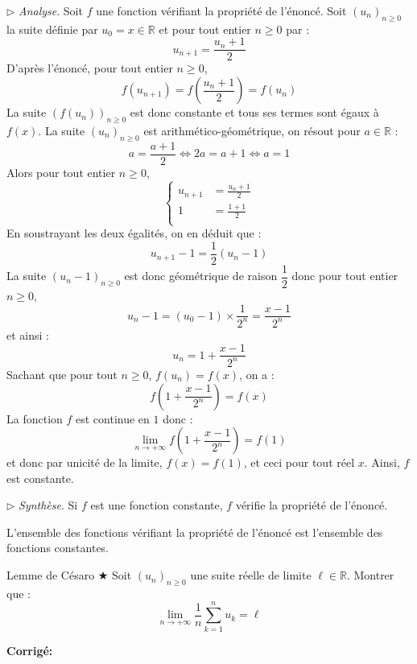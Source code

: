 \documentclass[a4paper,twoside,french,10pt]{VcCours}
\newcommand{\corr}{\textbf{Corrigé:}}
\begin{document}
\medskip

\noindent $\rhd$ \textit{Analyse}. Soit $f$ une fonction vérifiant la propriété de l'énoncé. Soit $(u_n)_{n \geq 0}$ la suite définie par $u_0=x \in \mathbb{R}$ et pour tout entier $n \geq 0$ par :
$$ u_{n+1} = \dfrac{u_n+1}{2}$$
D'après l'énoncé, pour tout entier $n \geq 0$,
$$ f(u_{n+1}) = f \left( \frac{u_n+1}{2} \right) = f(u_n)$$
La suite $(f(u_n))_{n \geq 0}$ est donc constante et tous ses termes sont égaux à $f(x)$. La suite $(u_n)_{n \geq 0}$ est arithmético-géométrique, on résout pour $a \in \mathbb{R}$ : 
$$ a = \dfrac{a+1}{2} \Longleftrightarrow 2a=a+1 \Longleftrightarrow a=1$$
Alors pour tout entier $n \geq 0$,
$$ \left\lbrace \begin{array}{cl}
u_{n+1} & =  \frac{u_n+1}{2}  \\[0.1cm]
1 & =  \frac{1+1}{2}  \\
\end{array}\right.$$
En soustrayant les deux égalités, on en déduit que :
$$u_{n+1}-1 = \dfrac{1}{2} (u_n-1)$$
La suite $(u_n-1)_{n \geq 0}$ est donc géométrique de raison $\dfrac{1}{2}$ donc pour tout entier $n \geq 0$,
$$ u_n - 1 = (u_0-1) \times \dfrac{1}{2^n} = \dfrac{x-1}{2^n}$$
et ainsi :
$$ u_n = 1 +  \dfrac{x-1}{2^n}$$
Sachant que pour tout $n \geq 0$, $f(u_n)=f(x)$, on a :
$$ f \left( 1 +  \dfrac{x-1}{2^n} \right) = f(x)$$
La fonction $f$ est continue en $1$ donc :
$$ \lim_{n \rightarrow + \infty}f \left( 1 +  \dfrac{x-1}{2^n} \right) = f(1)$$
et donc par unicité de la limite, $f(x)=f(1)$, et ceci pour tout réel $x$. Ainsi, $f$ est constante.

\medskip

\noindent $\rhd$ \textit{Synthèse}. Si $f$ est une fonction constante, $f$ vérifie la propriété de l'énoncé.

\medskip

\noindent L'ensemble des fonctions vérifiant la propriété de l'énoncé est l'ensemble des fonctions constantes.

\medskip


\begin{Exercice}{Lemme de Césaro $\bigstar$} Soit $(u_n)_{n \geq 0}$ une suite réelle de limite $\ell \in \mathbb{R}$. Montrer que :
$$ \lim_{n \rightarrow + \infty} \frac{1}{n} \sum_{k=1}^n u_k = \ell$$
\end{Exercice}

\corr
\end{document}

